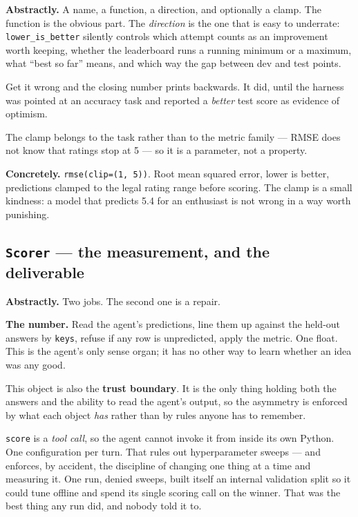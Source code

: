 \documentclass[11pt]{article}
\newcommand{\runin}[1]{\smallskip\noindent\textbf{#1}\quad}
\begin{document}
\runin{Abstractly.}
A name, a function, a direction, and optionally a clamp. The function is the obvious part. The
\emph{direction} is the one that is easy to underrate: \texttt{lower\_is\_better} silently
controls which attempt counts as an improvement worth keeping, whether the leaderboard runs a
running minimum or a maximum, what ``best so far'' means, and which way the gap between dev and
test points.

Get it wrong and the closing number prints backwards. It did, until the harness was pointed at
an accuracy task and reported a \emph{better} test score as evidence of optimism.

The clamp belongs to the task rather than to the metric family --- RMSE does not know that
ratings stop at 5 --- so it is a parameter, not a property.

\runin{Concretely.}
\texttt{rmse(clip=(1,\,5))}. Root mean squared error, lower is better, predictions clamped to the
legal rating range before scoring. The clamp is a small kindness: a model that predicts 5.4 for
an enthusiast is not wrong in a way worth punishing.

\subsection{\texttt{Scorer} --- the measurement, and the deliverable}

\runin{Abstractly.}
Two jobs. The second one is a repair.

\medskip\noindent\textbf{The number.} Read the agent's predictions, line them up against the
held-out answers by \texttt{keys}, refuse if any row is unpredicted, apply the metric. One float.
This is the agent's only sense organ; it has no other way to learn whether an idea was any good.

This object is also the \textbf{trust boundary}. It is the only thing holding both the answers
and the ability to read the agent's output, so the asymmetry is enforced by what each object
\emph{has} rather than by rules anyone has to remember.

\begin{aside}
\texttt{score} is a \emph{tool call}, so the agent cannot invoke it from inside its own Python.
One configuration per turn. That rules out hyperparameter sweeps --- and enforces, by accident,
the discipline of changing one thing at a time and measuring it. One run, denied sweeps, built
itself an internal validation split so it could tune offline and spend its single scoring call on
the winner. That was the best thing any run did, and nobody told it to.
\end{aside}
\end{document}
